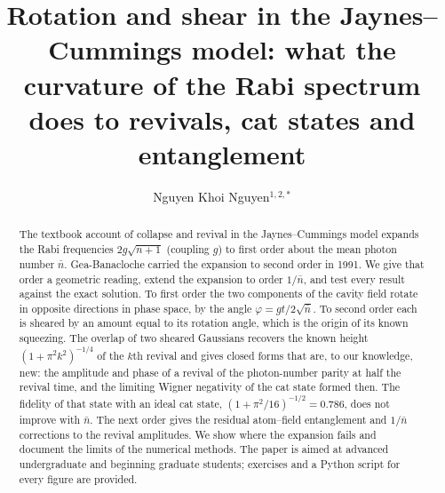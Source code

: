 \documentclass{iopjournal}
\newcommand{\nbar}{\bar{n}}
\begin{document}

\title{Rotation and shear in the Jaynes--Cummings model: what the curvature of the Rabi spectrum does to revivals, cat states and entanglement}

\author{Nguyen Khoi Nguyen$^{1,2,*}$}






\begin{abstract}
The textbook account of collapse and revival in the Jaynes--Cummings model expands the Rabi frequencies $2g\sqrt{n+1}$ (coupling $g$) to first order about the mean photon number $\nbar$. Gea-Banacloche carried the expansion to second order in 1991. We give that order a geometric reading, extend the expansion to order $1/\nbar$, and test every result against the exact solution. To first order the two components of the cavity field rotate in opposite directions in phase space, by the angle $\varphi = gt/2\sqrt{\nbar}$. To second order each is sheared by an amount equal to its rotation angle, which is the origin of its known squeezing. The overlap of two sheared Gaussians recovers the known height $(1+\pi^2k^2)^{-1/4}$ of the $k$th revival and gives closed forms that are, to our knowledge, new: the amplitude and phase of a revival of the photon-number parity at half the revival time, and the limiting Wigner negativity of the cat state formed then. The fidelity of that state with an ideal cat state, $(1+\pi^2/16)^{-1/2} = 0.786$, does not improve with $\nbar$. The next order gives the residual atom--field entanglement and $1/\nbar$ corrections to the revival amplitudes. We show where the expansion fails and document the limits of the numerical methods. The paper is aimed at advanced undergraduate and beginning graduate students; exercises and a Python script for every figure are provided.
\end{abstract}
\end{document}
